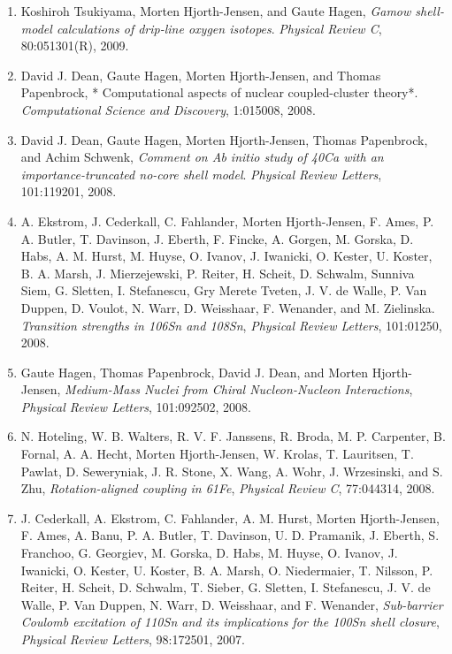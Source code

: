 \documentclass[a4wide,10pt]{article}
\begin{document}
\begin{enumerate}
\item Koshiroh Tsukiyama, Morten Hjorth-Jensen, and Gaute Hagen,  \emph{Gamow shell-model calculations of drip-line oxygen isotopes}.  \emph{Physical Review C}, 80:051301(R), 2009. 

\item David J. Dean, Gaute Hagen, Morten Hjorth-Jensen, and Thomas Papenbrock,  * Computational aspects of nuclear coupled-cluster theory*.  \emph{Computational Science and Discovery}, 1:015008, 2008. 

\item David J. Dean, Gaute Hagen, Morten Hjorth-Jensen, Thomas Papenbrock, and Achim Schwenk,  \emph{Comment on Ab initio study of 40Ca with an   importance-truncated no-core shell model}.  \emph{Physical Review Letters}, 101:119201, 2008. 

\item A. Ekstrom, J. Cederkall, C. Fahlander, Morten Hjorth-Jensen, F. Ames, P. A.   Butler, T. Davinson, J. Eberth, F. Fincke, A. Gorgen, M. Gorska, D. Habs,   A. M. Hurst, M. Huyse, O. Ivanov, J. Iwanicki, O. Kester, U. Koster, B. A.   Marsh, J. Mierzejewski, P. Reiter, H. Scheit, D. Schwalm, Sunniva Siem,   G. Sletten, I. Stefanescu, Gry Merete Tveten, J. V. de Walle, P. Van Duppen,   D. Voulot, N. Warr, D. Weisshaar, F. Wenander, and M. Zielinska.  \emph{Transition strengths in 106Sn and 108Sn},  \emph{Physical Review Letters}, 101:01250, 2008. 

\item Gaute Hagen, Thomas Papenbrock, David J. Dean, and Morten Hjorth-Jensen,  \emph{Medium-Mass Nuclei from Chiral Nucleon-Nucleon Interactions},  \emph{Physical Review Letters}, 101:092502, 2008. 

\item N. Hoteling, W. B. Walters, R. V. F. Janssens, R. Broda, M. P. Carpenter,   B. Fornal, A. A. Hecht, Morten Hjorth-Jensen, W. Krolas, T. Lauritsen,   T. Pawlat, D. Seweryniak, J. R. Stone, X. Wang, A. Wohr, J. Wrzesinski, and   S. Zhu,  \emph{Rotation-aligned coupling in 61Fe},  \emph{Physical Review C}, 77:044314, 2008. 

\item J. Cederkall, A. Ekstrom, C. Fahlander, A. M. Hurst, Morten Hjorth-Jensen,   F. Ames, A. Banu, P. A. Butler, T. Davinson, U. D. Pramanik, J. Eberth,   S. Franchoo, G. Georgiev, M. Gorska, D. Habs, M. Huyse, O. Ivanov,   J. Iwanicki, O. Kester, U. Koster, B. A. Marsh, O. Niedermaier, T. Nilsson,   P. Reiter, H. Scheit, D. Schwalm, T. Sieber, G. Sletten, I. Stefanescu, J. V.   de Walle, P. Van Duppen, N. Warr, D. Weisshaar, and F. Wenander, \emph{Sub-barrier Coulomb excitation of 110Sn and its   implications for the 100Sn shell closure},  \emph{Physical Review Letters}, 98:172501, 2007. 


\end{enumerate}
\end{document}
